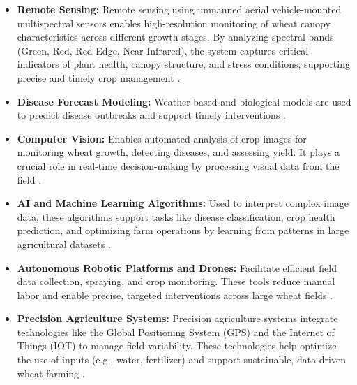 \begin{itemize}
    \item \textbf{Remote Sensing:} Remote sensing using unmanned aerial vehicle-mounted multispectral sensors enables high-resolution monitoring of wheat canopy characteristics across different growth stages. By analyzing spectral bands (Green, Red, Red Edge, Near Infrared), the system captures critical indicators of plant health, canopy structure, and stress conditions, supporting precise and timely crop management \parencite{zhang2025precision}.
    \item \textbf{Disease Forecast Modeling:} Weather-based and biological models are used to predict disease outbreaks and support timely interventions \parencite{mehta2014wheat}.
    \item \textbf{Computer Vision:} Enables automated analysis of crop images for monitoring wheat growth, detecting diseases, and assessing yield. It plays a crucial role in real-time decision-making by processing visual data from the field \parencite{ghazal2024computer}.
    \item \textbf{AI and Machine Learning Algorithms:} Used to interpret complex image data, these algorithms support tasks like disease classification, crop health prediction, and optimizing farm operations by learning from patterns in large agricultural datasets \parencite{ghazal2024computer}.
    \item \textbf{Autonomous Robotic Platforms and Drones:} Facilitate efficient field data collection, spraying, and crop monitoring. These tools reduce manual labor and enable precise, targeted interventions across large wheat fields \parencite{ghazal2024computer}.
    \item \textbf{Precision Agriculture Systems:} Precision agriculture systems integrate technologies like the Global Positioning System (GPS) and the Internet of Things  (IOT) to manage field variability. These technologies help optimize the use of inputs (e.g., water, fertilizer) and support sustainable, data-driven wheat farming \parencite{ghazal2024computer}.
\end{itemize}



